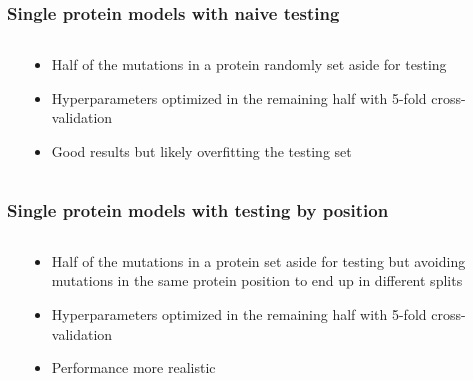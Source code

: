 \documentclass[10pt, british]{beamer}
\begin{document}
\begin{frame}
	\frametitle{Single protein models with naive testing}
	\begin{columns}[c]
		\begin{column}{.6\textwidth}
			\centering%
			\vspace{2em}
			
		\end{column}
		\begin{column}{.4\textwidth}
			\begin{itemize}
				\item Half of the mutations in a protein randomly set aside for testing
				\item Hyperparameters optimized in the remaining half with 5-fold cross-validation
				\item Good results but likely overfitting the testing set
			\end{itemize}
		\end{column}
	\end{columns}
\end{frame}

\begin{frame}
	\frametitle{Single protein models with testing by position}
	\begin{columns}[c]
		\begin{column}{.6\textwidth}
			\centering%
			\vspace{2em}
			
		\end{column}
		\begin{column}{.4\textwidth}
			\begin{itemize}
				\item Half of the mutations in a protein set aside for testing but avoiding mutations in the same protein position to end up in different splits
				\item Hyperparameters optimized in the remaining half with 5-fold cross-validation
				\item Performance more realistic
			\end{itemize}
		\end{column}
	\end{columns}
\end{frame}
\end{document}
